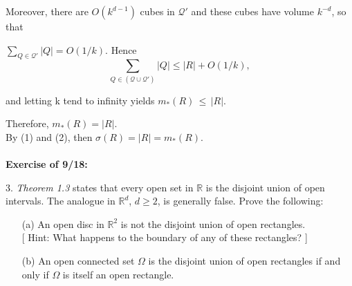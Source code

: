 \documentclass[a4paper,11pt]{article}
\begin{document}
Moreover, there are $O(k^{d-1})$ cubes in $\mathcal{Q}'$  and these cubes have volume $k^{-d}$, so that

$\underset{Q \in \mathcal{Q}'}{\sum}|Q| = O(1/k)$. Hence
	$$\underset{Q \in (\mathcal{Q} \cup \mathcal{Q}')}{\sum} |Q|
	\leq |R| + O(1/k),$$

and letting k tend to infinity yields $m_*(R)\,\leq\,|R|$.

Therefore, $m_*(R) = |R|$.\\

By (1) and (2), then $\sigma(R) = |R| = m_*(R)$.\\\\


\textbf{Exercise of 9/18:}

3. \textit{Theorem 1.3} states that every open set in $\mathbb{R}$ is the disjoint union of open intervals. The analogue in $\mathbb{R}^d$, $d \geq 2$, is generally false. Prove the following:

\begin{enumerate}
	\item [(a)] An open disc in $\mathbb{R}^2$ is not the disjoint union of open rectangles.\\
	{[}
	Hint: What happens to the boundary of any of these rectangles?
	{]}

	\item [(b)] An open connected set $\Omega$ is the disjoint union of open rectangles if and only if $\Omega$ is itself an open rectangle.
\end{enumerate}
\end{document}

